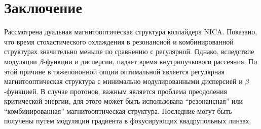 \section{Заключение}

\par Рассмотрена дуальная магнитооптическая структура коллайдера NICA. Показано, что время стохастического охлаждения в резонансной и комбинированной структурах значительно меньше по сравнению с регулярной. Однако, вследствие модуляции $\beta$-функции и дисперсии, падает время внутрипучкового рассеяния. По этой причине в тяжелоионной опции оптимальной является регулярная магнитооптическая структура с минимально модулированными дисперсией и $\beta$-функцией. В случае протонов, важным является проблема преодоления критической энергии, для этого может быть использована “резонансная” или “комбинированная” магнитооптическая структура. Последние могут быть получены путем модуляции градиента в фокусирующих квадрупольных линзах.

\FloatBarrier
